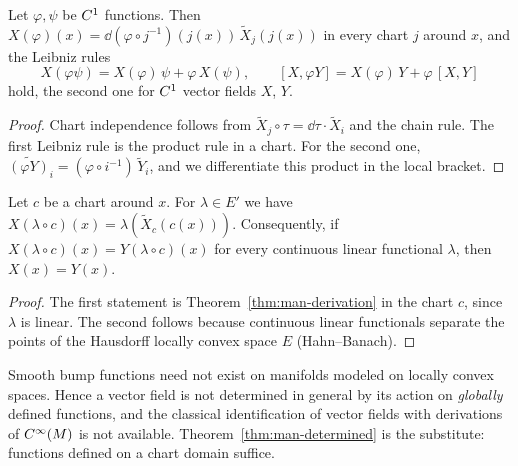 \begin{theorem}
  \label{thm:man-derivation}
  \leanok
  Let $\varphi, \psi$ be $C^{1}$ functions. Then $X(\varphi)(x) = \dd(\varphi \circ
  j^{-1})(j(x))\,\widetilde{X}_j(j(x))$ in every chart $j$ around $x$, and the Leibniz rules
  \[
    X(\varphi\psi) = X(\varphi)\,\psi + \varphi\,X(\psi), \qquad
    [X, \varphi Y] = X(\varphi)\,Y + \varphi\,[X, Y]
  \]
  hold, the second one for $C^{1}$ vector fields $X$, $Y$.
\end{theorem}

\begin{proof}
  \leanok
  Chart independence follows from $\widetilde{X}_j \circ \tau = \dd\tau \cdot \widetilde{X}_i$
  and the chain rule. The first Leibniz rule is the product rule in a chart. For the second one,
  $\widetilde{(\varphi Y)}_i = (\varphi \circ i^{-1})\,\widetilde{Y}_i$, and we differentiate this
  product in the local bracket.
\end{proof}

\begin{theorem}
  \label{thm:man-determined}
  \leanok
  Let $c$ be a chart around $x$. For $\lambda \in E'$ we have $X(\lambda \circ c)(x) =
  \lambda(\widetilde{X}_c(c(x)))$. Consequently, if $X(\lambda \circ c)(x) = Y(\lambda \circ c)(x)$
  for every continuous linear functional $\lambda$, then $X(x) = Y(x)$.
\end{theorem}

\begin{proof}
  \leanok
  The first statement is Theorem~\ref{thm:man-derivation} in the chart $c$, since $\lambda$ is
  linear. The second follows because continuous linear functionals separate the points of the
  Hausdorff locally convex space $E$ (Hahn--Banach).
\end{proof}

\begin{remark}
  \label{rem:man-no-bumps}
  Smooth bump functions need not exist on manifolds modeled on locally convex spaces. Hence a vector field is not determined in general by its
  action on \emph{globally} defined functions, and the classical identification of vector fields
  with derivations of $C^{\infty}(M)$ is not available. Theorem~\ref{thm:man-determined} is the
  substitute: functions defined on a chart domain suffice.
\end{remark}


